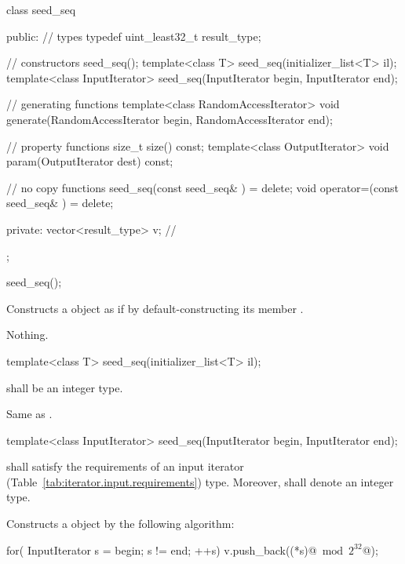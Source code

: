 \begin{codeblock}
class seed_seq
{
public:
 // types
 typedef uint_least32_t result_type;

 // constructors
 seed_seq();
 template<class T>
   seed_seq(initializer_list<T> il);
 template<class InputIterator>
   seed_seq(InputIterator begin, InputIterator end);

 // generating functions
 template<class RandomAccessIterator>
   void generate(RandomAccessIterator begin, RandomAccessIterator end);

 // property functions
 size_t size() const;
 template<class OutputIterator>
   void param(OutputIterator dest) const;

 // no copy functions
 seed_seq(const seed_seq& ) = delete;
 void operator=(const seed_seq& ) = delete;

private:
 vector<result_type> v;   // \expos
};
\end{codeblock}%


%
\begin{itemdecl}
seed_seq();
\end{itemdecl}

\begin{itemdescr}
\pnum\effects Constructs a  object
 as if by default-constructing its member .

\pnum
\throws Nothing.
\end{itemdescr}


%
\begin{itemdecl}
template<class T>
 seed_seq(initializer_list<T> il);
\end{itemdecl}

\begin{itemdescr}
\pnum\requires {} shall be an integer type.

\pnum\effects
 Same as .
\end{itemdescr}


%
\begin{itemdecl}
template<class InputIterator>
  seed_seq(InputIterator begin, InputIterator end);
\end{itemdecl}

\begin{itemdescr}
\pnum\requires
   shall satisfy the requirements
  of an input iterator (Table~\ref{tab:iterator.input.requirements}) type.
  Moreover,
  shall denote an integer type.

\pnum\effects Constructs a  object
 by the following algorithm:
\begin{codeblock}
for( InputIterator s = begin; s != end; ++s)
 v.push_back((*s)@$\bmod 2^{32}$@);
\end{codeblock}%
\end{itemdescr}

